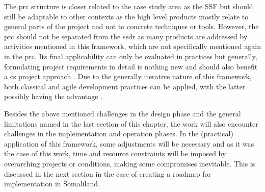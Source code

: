 The \acrshort{prc} structure is closer related to the case study area as the SSF but should still be adaptable to other contexts as the high level products mostly relate to general parts of the project and not to concrete techniques or tools. However, the \acrshort{prc} should not be separated from the \acrshort{ssdr} as many products are addressed by activities mentioned in this framework, which are not specifically mentioned again in the \acrshort{prc}. Its final applicability can only be evaluated in practices but generally, formulating project requirements in detail is nothing new and should also benefit a \acrshort{cs} project approach \autocite{wiegersSoftwareRequirements2013,youngEffectiveRequirementsPractices2001,youngProjectRequirementsGuide2006}. Due to the generally iterative nature of this framework, both classical and agile development practices can be applied, with the latter possibly having the advantage \autocite{confortoCanAgileProject2014,ManifestoAgileSoftware}.\newline

Besides the above mentioned challenges in the design phase and the general limitations named in the last section of this chapter, the work will also encounter challenges in the implementation and operation phases. In the (practical) application of this framework, some adjustments will be necessary and as it was the case of this work, time and resource constraints will be imposed by overarching projects or conditions, making some compromises inevitable. This is discussed in the next section in the case of creating a roadmap for implementation in Somaliland.



